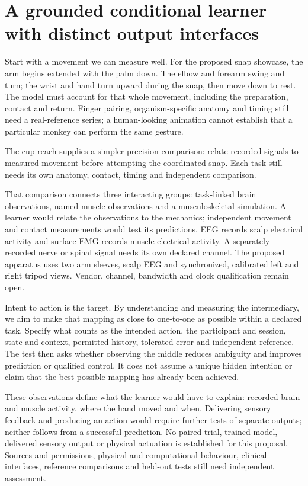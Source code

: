 \section[A grounded conditional learner with distinct output interfaces]{A grounded conditional learner\\with distinct output interfaces}
Start with a movement we can measure well. For the proposed snap showcase,
the arm begins extended with the palm down. The elbow and forearm swing and
turn; the wrist and hand turn upward during the snap, then move down to rest.
The model must account for that whole movement, including the preparation,
contact and return. Finger pairing, organism-specific anatomy and timing still
need a real-reference series; a human-looking animation cannot establish that
a particular monkey can perform the same gesture.

The cup reach supplies a simpler precision comparison: relate recorded signals
to measured movement before attempting the coordinated snap. Each task still
needs its own anatomy, contact, timing and independent comparison.

That comparison connects three interacting groups: task-linked brain
observations, named-muscle observations and a musculoskeletal simulation.
A learner would relate the observations to the mechanics; independent movement
and contact measurements would test its predictions. EEG records scalp
electrical activity and surface EMG records muscle electrical activity.
A separately recorded nerve or spinal signal needs its own declared channel.
The proposed apparatus uses two arm sleeves, scalp EEG and synchronized,
calibrated left and right tripod views. Vendor, channel, bandwidth and clock
qualification remain open.

Intent to action is the target. By understanding and measuring the intermediary,
we aim to make that mapping as close to one-to-one as possible within a declared
task. Specify what counts as the intended action, the participant and session,
state and context, permitted history, tolerated error and independent reference.
The test then asks whether observing the middle reduces ambiguity and improves
prediction or qualified control. It does not assume a unique hidden intention
or claim that the best possible mapping has already been achieved.

These observations define what the learner would have to explain: recorded
brain and muscle activity, where the hand moved and when. Delivering sensory
feedback and producing an action would require further tests of separate
outputs; neither follows from a successful prediction. No paired trial, trained
model, delivered sensory output or physical actuation is established for this
proposal. Sources and permissions, physical and computational behaviour,
clinical interfaces, reference comparisons and held-out tests still need
independent assessment.


